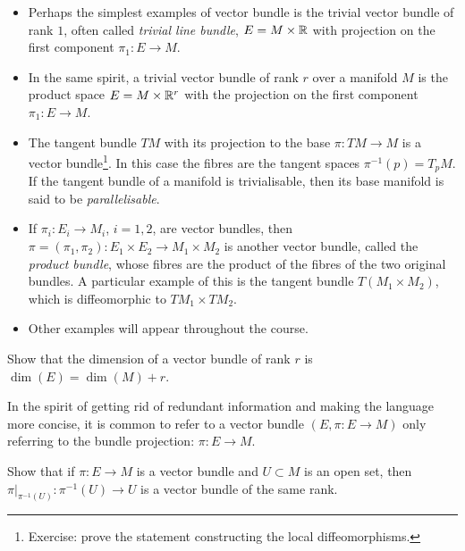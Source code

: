 \begin{example}\label{ex:simple_bundles}
	\begin{itemize}
		\item Perhaps the simplest examples of vector bundle is the trivial vector bundle of rank $1$, often called \emph{trivial line bundle}, $E = M \times \mathbb{R}$ with projection on the first component $\pi_1: E \to M$.
		\item In the same spirit, a trivial vector bundle of rank $r$ over a manifold $M$ is the product space $E = M\times \mathbb{R}^r$ with the projection on the first component $\pi_1: E\to M$.
		\item The tangent bundle $TM$ with its projection to the base $\pi:TM\to M$ is a vector bundle\footnote{Exercise: prove the statement constructing the local diffeomorphisms.}.
		      In this case the fibres are the tangent spaces $\pi^{-1}(p) = T_pM$.
		      If the tangent bundle of a manifold is trivialisable, then its base manifold is said to be \emph{parallelisable}.
		\item If $\pi_i: E_i\to M_i$, $i=1,2$, are vector bundles, then $\pi = (\pi_1, \pi_2): E_1\times E_2 \to M_1\times M_2$ is another vector bundle, called the \emph{product bundle}, whose fibres are the product of the fibres of the two original bundles.
		      A particular example of this is the tangent bundle $T(M_1\times M_2)$, which is diffeomorphic to $TM_1 \times TM_2$.
		\item Other examples will appear throughout the course.
	\end{itemize}
\end{example}

\begin{exercise}
	Show that the dimension of a vector bundle of rank $r$ is $\dim(E) = \dim(M) + r$.
\end{exercise}

\begin{remark}
	In the spirit of getting rid of redundant information and making the language more concise, it is common to refer to a vector bundle $(E, \pi : E \to M)$ only referring to the bundle projection: $\pi : E \to M$.
\end{remark}

\begin{exercise}
	Show that if $\pi:E\to M$ is a vector bundle and $U\subset M$ is an open set, then $\pi\big|_{\pi^{-1}(U)}: \pi^{-1}(U) \to U$ is a vector bundle of the same rank.
\end{exercise}

